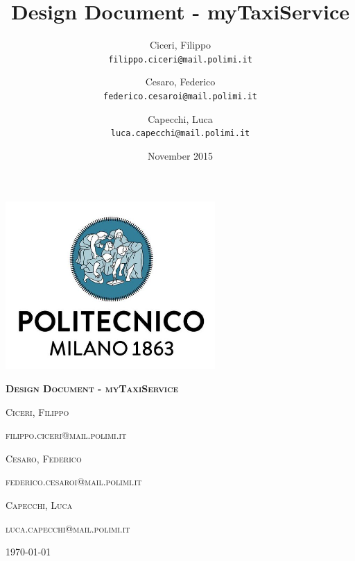 \documentclass[12pt,a4paper,titlepage]{article}
\title{Design Document - myTaxiService}
\author{
	Ciceri, Filippo \\
	\texttt{filippo.ciceri@mail.polimi.it}
	\and
	Cesaro, Federico \\
	\texttt{federico.cesaroi@mail.polimi.it}
	\and
	Capecchi, Luca \\
	\texttt{luca.capecchi@mail.polimi.it}
}
\date{November 2015}
\begin{document}
\begin{titlepage}
	\centering
	\includegraphics[width=8cm]{../polimiLogo}\par\vspace{2cm}
	{\scshape\huge\bfseries Design Document - myTaxiService \par}
	\vspace{1.5cm}
	{\scshape\large Ciceri, Filippo \par}
	{\scshape\normalsize filippo.ciceri@mail.polimi.it \par}
	\vspace{0.5cm}
	{\scshape\large Cesaro, Federico \par}
	{\scshape\normalsize federico.cesaroi@mail.polimi.it \par}
	\vspace{0.5cm}
	{\scshape\large Capecchi, Luca \par}
	{\scshape\normalsize luca.capecchi@mail.polimi.it \par}
	\vspace{0.5cm}

	\vfill

	{\large \today\par}
\end{titlepage}
\tableofcontents
\newpage

\newpage


\newpage


\newpage


\newpage


\newpage


\newpage

\end{document}
